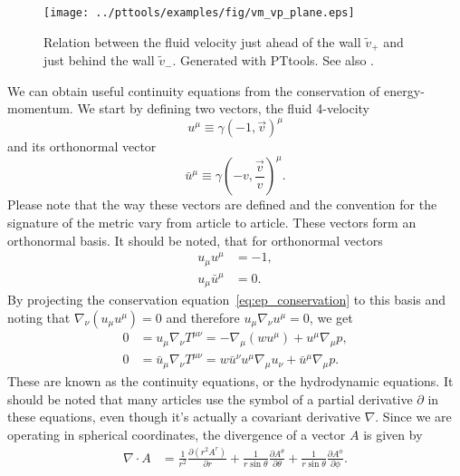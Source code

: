 \begin{figure}[h!]
\centering
\texttt{[image: ../pttools/examples/fig/vm\_vp\_plane.eps]}
\caption{Relation between the fluid velocity just ahead of the wall $\tilde{v}_+$ and just behind the wall $\tilde{v}_-$. Generated with PTtools. See also \cite[fig. 13]{lecture_notes}.}
\label{fig:vplus_vminus}
\end{figure}

We can obtain useful continuity equations from the conservation of energy-momentum.
We start by defining two vectors, the fluid 4-velocity
\begin{equation}
u^\mu \equiv \gamma(-1, \overrightarrow{v})^\mu
\label{eq:u_mu}
\end{equation}
and its orthonormal vector
\begin{equation}
\bar{u}^\mu \equiv \gamma(-v, \frac{\overrightarrow{v}}{v})^\mu.
\end{equation}
Please note that the way these vectors are defined and the convention for the signature of the metric vary
from article to article.
These vectors form an orthonormal basis.
It should be noted, that for orthonormal vectors
\begin{align}
u_\mu u^\mu &= -1, \\
u_\mu \bar{u}^\mu &= 0.
\end{align}
\cite[p. 36]{lecture_notes}
By projecting the conservation equation~\eqref{eq:ep_conservation} to this basis and noting that
$\nabla_\nu (u_\mu u^\mu) = 0$ and therefore $u_\mu \nabla_\nu u^\mu = 0$, we get
\cite[eq. 7.28-7.29]{lecture_notes}
\begin{align}
0 &= u_\mu \nabla_\nu T^{\mu \nu} = -\nabla_\mu (w u^\mu) + u^\mu \nabla_\mu p,
\label{eq:continuity1} \\
0 &= \bar{u}_\mu \nabla_\nu T^{\mu \nu} = w \bar{u}^\nu u^\mu \nabla_\mu u_\nu + \bar{u}^\mu \nabla_\mu p.
\label{eq:continuity2}
\end{align}
These are known as the continuity equations, or the hydrodynamic equations.
It should be noted that many articles use the symbol of a partial derivative $\partial$ in these equations,
even though it's actually a covariant derivative $\nabla$.
Since we are operating in spherical coordinates,
the divergence of a vector $A$ is given by
\begin{align}
\nabla \cdot A
&= \frac{1}{r^2} \frac{\partial (r^2 A^r)}{\partial r}
+ \frac{1}{r \sin \theta} \frac{\partial A^\theta}{\partial \theta}
+ \frac{1}{r \sin \theta} \frac{\partial A^\phi}{\partial \phi}.
\label{eq:divergence}
\end{align}
